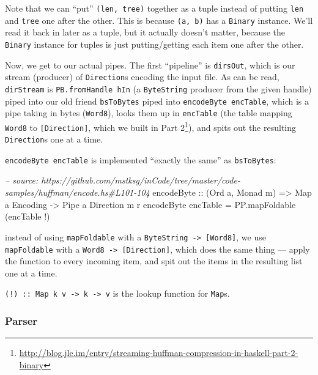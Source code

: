 \documentclass[]{article}
\newenvironment{Shaded}{}{}
\newcommand{\DataTypeTok}[1]{\textcolor[rgb]{0.56,0.13,0.00}{{#1}}}
\newcommand{\CommentTok}[1]{\textcolor[rgb]{0.38,0.63,0.69}{\textit{{#1}}}}
\newcommand{\OtherTok}[1]{\textcolor[rgb]{0.00,0.44,0.13}{{#1}}}
\newcommand{\FunctionTok}[1]{\textcolor[rgb]{0.02,0.16,0.49}{{#1}}}
\newcommand{\NormalTok}[1]{{#1}}
\renewcommand{\href}[2]{#2\footnote{\url{#1}}}
\begin{document}
Note that we can ``put'' \texttt{(len,\ tree)} together as a tuple
instead of putting \texttt{len} and \texttt{tree} one after the other.
This is because \texttt{(a,\ b)} has a \texttt{Binary} instance. We'll
read it back in later as a tuple, but it actually doesn't matter,
because the \texttt{Binary} instance for tuples is just putting/getting
each item one after the other.

Now, we get to our actual pipes. The first ``pipeline'' is
\texttt{dirsOut}, which is our stream (producer) of \texttt{Direction}s
encoding the input file. As can be read, \texttt{dirStream} is
\texttt{PB.fromHandle\ hIn} (a \texttt{ByteString} producer from the
given handle) piped into our old friend \texttt{bsToBytes} piped into
\texttt{encodeByte\ encTable}, which is a pipe taking in bytes
(\texttt{Word8}), looks them up in \texttt{encTable} (the table mapping
\texttt{Word8} to \texttt{{[}Direction{]}}, which we built in
\href{http://blog.jle.im/entry/streaming-huffman-compression-in-haskell-part-2-binary}{Part
2}), and spits out the resulting \texttt{Direction}s one at a time.

\texttt{encodeByte\ encTable} is implemented ``exactly the same'' as
\texttt{bsToBytes}:

\begin{Shaded}
\begin{Highlighting}[]
\CommentTok{-- source: https://github.com/mstksg/inCode/tree/master/code-samples/huffman/encode.hs#L101-104}
\OtherTok{encodeByte ::} \NormalTok{(}\DataTypeTok{Ord} \NormalTok{a, }\DataTypeTok{Monad} \NormalTok{m)}
           \OtherTok{=>} \DataTypeTok{Map} \NormalTok{a }\DataTypeTok{Encoding}
           \OtherTok{->} \DataTypeTok{Pipe} \NormalTok{a }\DataTypeTok{Direction} \NormalTok{m r}
\NormalTok{encodeByte encTable }\FunctionTok{=} \NormalTok{PP.mapFoldable (encTable }\FunctionTok{!}\NormalTok{)}
\end{Highlighting}
\end{Shaded}

instead of using \texttt{mapFoldable} with a
\texttt{ByteString\ -\textgreater{}\ {[}Word8{]}}, we use
\texttt{mapFoldable} with a
\texttt{Word8\ -\textgreater{}\ {[}Direction{]}}, which does the same
thing --- apply the function to every incoming item, and spit out the
items in the resulting list one at a time.

\texttt{(!)\ ::\ Map\ k\ v\ -\textgreater{}\ k\ -\textgreater{}\ v} is
the lookup function for \texttt{Map}s.

\subsubsection{Parser}\label{parser}
\end{document}
